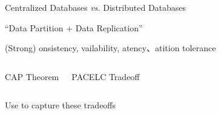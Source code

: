 
\begin{frame}{}
	\begin{center}
		Centralized Databases \emph{vs.} Distributed Databases


	\end{center}
\end{frame}

\begin{frame}{}
	\begin{center}
		``Data Partition + Data Replication''
	\end{center}
\end{frame}

\begin{frame}{}
	\begin{center}
		(Strong) \underline{}onsistency, \underline{}vailability,
		\underline{}atency、\underline{}atition tolerance
	\end{center}
	\begin{columns}[c]
		\begin{center}
			{CAP Theorem}%
		\end{center}
		\begin{center}

			\vspace{0.50cm}
			{PACELC Tradeoff}
		\end{center}
	\end{columns}
\end{frame}

\begin{frame}{}
	\begin{center}
		Use  to capture these tradeoffs
	\end{center}

	\begin{columns}[c]
	\end{columns}
\end{frame}

